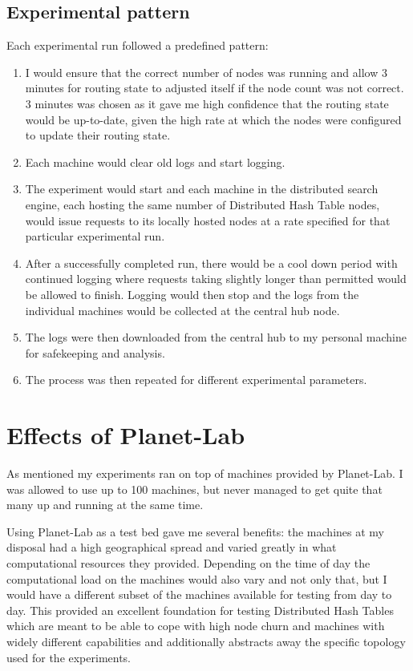 \subsection{Experimental pattern}
Each experimental run followed a predefined pattern:
\begin{enumerate}
\item I would ensure that the correct number of nodes was running and allow 3 minutes for routing state to adjusted itself if the node count was not correct. 3 minutes was chosen as it gave me high confidence that the routing state would be up-to-date, given the high rate at which the nodes were configured to update their routing state.
\item Each machine would clear old logs and start logging.
\item The experiment would start and each machine in the distributed search engine, each hosting the same number of Distributed Hash Table nodes, would issue requests to its locally hosted nodes at a rate specified for that particular experimental run.
\item After a successfully completed run, there would be a cool down period with continued logging where requests taking slightly longer than permitted would be allowed to finish. Logging would then stop and the logs from the individual machines would be collected at the central hub node.
\item The logs were then downloaded from the central hub to my personal machine for safekeeping and analysis.
\item The process was then repeated for different experimental parameters.
\end{enumerate}

\section{Effects of Planet-Lab}
As mentioned my experiments ran on top of machines provided by Planet-Lab. I was allowed to use up to 100 machines, but never managed to get quite that many up and running at the same time.

Using Planet-Lab as a test bed gave me several benefits: the machines at my disposal had a high geographical spread and varied greatly in what computational resources they provided. Depending on the time of day the computational load on the machines would also vary and not only that, but I would have a different subset of the machines available for testing from day to day.
This provided an excellent foundation for testing Distributed Hash Tables which are meant to be able to cope with high node churn and machines with widely different capabilities and additionally abstracts away the specific topology used for the experiments.

